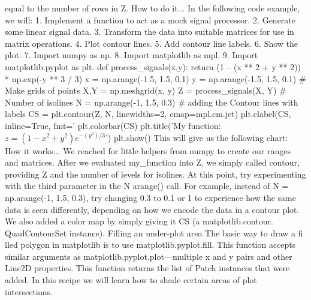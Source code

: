 equal to the number of rows in Z.
How to do it...
In the following code example, we will:
1. Implement a function to act as a mock signal processor.
2. Generate some linear signal data.
3. Transform the data into suitable matrices for use in matrix operations.
4. Plot contour lines.
5. Add contour line labels.
6. Show the plot.
7. Import numpy as np.
8. Import matplotlib as mpl.
9. Import matplotlib.pyplot as plt.
def process_signals(x,y):
 return (1 – (x ** 2 + y ** 2)) * np.exp(-y ** 3 / 3)
x = np.arange(-1.5, 1.5, 0.1)
y = np.arange(-1.5, 1.5, 0.1)
# Make grids of points
X,Y = np.meshgrid(x, y)
Z = process_signals(X, Y)
# Number of isolines
N = np.arange(-1, 1.5, 0.3)
# adding the Contour lines with labels
CS = plt.contour(Z, N, linewidths=2, cmap=mpl.cm.jet)
plt.clabel(CS, inline=True, fmt='%
plt.colorbar(CS)
plt.title('My function: $z=(1-x^2+y^2) e^{-(y^3)/3}$')
plt.show()
This will give us the following chart:
How it works...
We reached for little helpers from numpy to create our ranges and matrices.
After we evaluated my_function into Z, we simply called contour, providing Z and the
number of levels for isolines.
At this point, try experimenting with the third parameter in the N arange() call.
For example, instead of N = np.arange(-1, 1.5, 0.3), try changing 0.3 to 0.1 or 1
to experience how the same data is seen differently, depending on how we encode the data
in a contour plot.
We also added a color map by simply giving it CS (a matplotlib.contour.
QuadContourSet instance).
Filling an under-plot area
The basic way to draw a fi lled polygon in matplotlib is to use matplotlib.pyplot.fill.
This function accepts similar arguments as matplotlib.pyplot.plot—multiple x and
y pairs and other Line2D properties. This function returns the list of Patch instances that
were added.
In this recipe we will learn how to shade certain areas of plot intersections.
